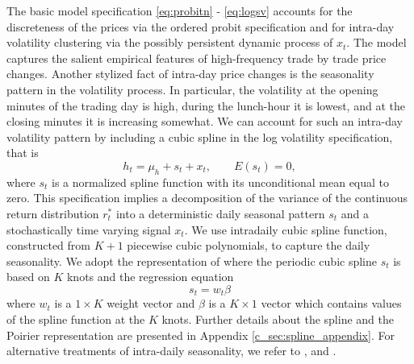 \documentclass[12pt]{article}
\begin{document}
The basic model specification \eqref{eq:probitn} - \eqref{eq:logsv}
accounts for the discreteness of the prices
via the ordered probit specification and
for intra-day volatility clustering via the possibly persistent dynamic process of $x_{t}$.
The model captures the salient empirical features of high-frequency
trade by trade price changes.
Another stylized fact of intra-day price changes is the seasonality
pattern in the volatility process.
In particular, the volatility at the opening minutes of the trading day is high,
during the lunch-hour it is lowest, and at the closing minutes it is increasing somewhat.
We can account for such an intra-day volatility pattern by including
a cubic spline in the log volatility specification, that is
\begin{equation}
\label{eq:logsvspl}
h_t = \mu_h + s_t +x_t ,
\qquad
E(s_t) = 0 ,
\end{equation} 
where $s_t$ is a normalized spline function with its unconditional mean equal to zero.
This specification implies a decomposition of the variance
of the continuous return distribution $r^{*}_t$  into a
deterministic daily seasonal pattern $s_t$ and a stochastically
time varying signal $x_t$.
We use intradaily cubic spline function,
constructed from $K+1$ piecewise cubic polynomials, to capture the daily seasonality. 
We adopt the representation of \citet{Poirier1973} where
the periodic cubic spline $s_t$ is based on $K$ knots and the
regression equation
\begin{equation}
\label{eq:spline}
s_t = w_t \beta 
\end{equation}
where $w_t$ is a $1 \times K$ weight vector and $\beta$ is a $K \times 1$
vector which contains values of the spline function at the $K$ knots.
Further details about the spline and the Poirier representation
are presented in Appendix \ref{c_sec:spline_appendix}.
For alternative treatments of intra-daily seasonality, we refer to  
\citet{Bos2008}, \citet{JohannesStroud2014} and
\citet{WeinbergBrownStroud2007}.
\end{document}
